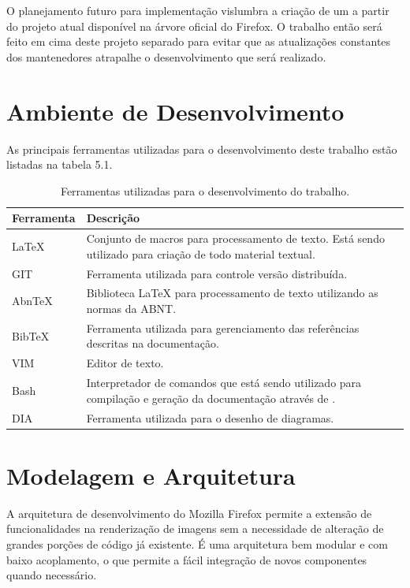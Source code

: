 \documentclass[espaco=simples,appendix=Name]{abnt}
\begin{document}
O planejamento futuro para implementação vislumbra a criação de um  a partir do projeto atual disponível na árvore oficial do Firefox. O trabalho então será feito em cima deste projeto separado para evitar que as atualizações constantes dos mantenedores atrapalhe o desenvolvimento que será realizado.

\section{Ambiente de Desenvolvimento}

As principais ferramentas utilizadas para o desenvolvimento deste trabalho estão listadas na tabela 5.1.

\begin{table}[ht]
	\centering
	\caption{Ferramentas utilizadas para o desenvolvimento do trabalho.
	\label{tbl:padc}}{
		\vspace{0.3cm}
		\begin{tabular}{|l|p{14cm}|}
	    	\hline
			\textbf{Ferramenta} & \textbf{Descrição} \\
			\hline
			LaTeX		& Conjunto de macros para processamento de texto. Está sendo utilizado para criação de todo material textual. \\
			\hline
			GIT		& Ferramenta utilizada para controle versão distribuída. \\
			\hline
			AbnTeX		& Biblioteca LaTeX para processamento de texto utilizando as normas da ABNT. \\
			\hline
			BibTeX		& Ferramenta utilizada para gerenciamento das referências descritas na documentação. \\
			\hline
			VIM		& Editor de texto. \\
			\hline
			Bash		& Interpretador de comandos que está sendo utilizado para compilação e geração da documentação através de \ingles{scripts}. \\
			\hline
			DIA		& Ferramenta utilizada para o desenho de diagramas. \\
			\hline
		\end{tabular}
		}
\end{table}

\section{Modelagem e Arquitetura}

A arquitetura de desenvolvimento do Mozilla Firefox permite a extensão de funcionalidades na renderização de imagens sem a necessidade de alteração de grandes porções de código já existente. É uma arquitetura bem modular e com baixo acoplamento, o que permite a fácil integração de novos componentes quando necessário. 
\end{document}
